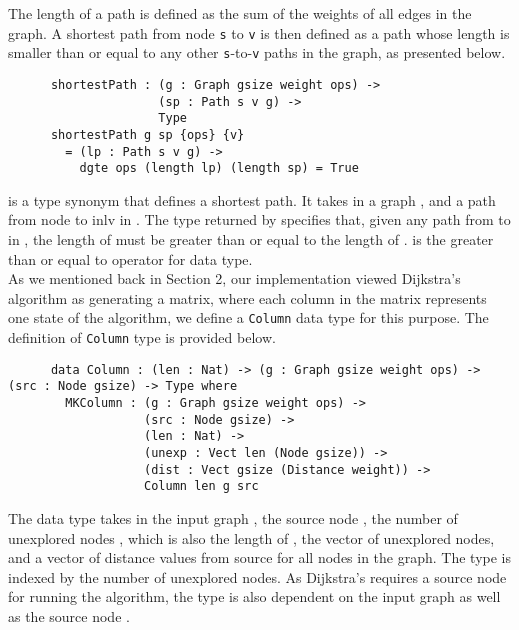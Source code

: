 The length of a path is defined as the sum of the weights of all edges in the graph. A shortest path from node \texttt{s} to \texttt{v} is then defined as a path whose length is smaller than or equal to any other \texttt{s}-to-\texttt{v} paths in the graph, as presented below. 

\begin{lstlisting}
      shortestPath : (g : Graph gsize weight ops) ->
                     (sp : Path s v g) ->
                     Type
      shortestPath g sp {ops} {v}
        = (lp : Path s v g) ->
          dgte ops (length lp) (length sp) = True
\end{lstlisting}

 is a type synonym that defines a shortest path. It takes in a graph , and a path  from node  to inl{v} in . The type returned by  specifies that, given any path  from  to  in , the length of  must be greater than or equal to the length of .  is the greater than or equal to operator for  data type. 
\\

As we mentioned back in Section 2, our implementation viewed Dijkstra's algorithm as generating a matrix, where each column in the matrix represents one state of the algorithm, we define a \texttt{Column} data type for this purpose. The definition of \texttt{Column} type is provided below. 

\begin{lstlisting}
      data Column : (len : Nat) -> (g : Graph gsize weight ops) -> (src : Node gsize) -> Type where
        MKColumn : (g : Graph gsize weight ops) ->
                   (src : Node gsize) ->
                   (len : Nat) ->
                   (unexp : Vect len (Node gsize)) ->
                   (dist : Vect gsize (Distance weight)) ->
                   Column len g src

\end{lstlisting}

The  data type takes in the input graph , the source node , the number of unexplored nodes , which is also the length of , the vector of unexplored nodes, and a vector of distance values from source for all nodes in the graph. The  type is indexed by the number of unexplored nodes. As Dijkstra's requires a source node for running the algorithm, the type  is also dependent on the input graph as well as the source node .
\\

